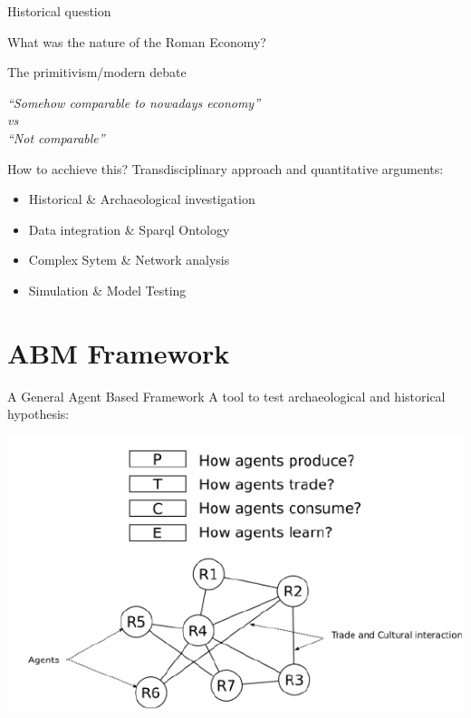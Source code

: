 \documentclass[12pt, handout=show,notes=show]{beamer}
\begin{document}
\begin{frame}{Historical question}
	\begin{center}
		\Huge
		What was the nature of the Roman Economy?\\
	\end{center}
	\vfill
	\begin{block}
		{The primitivism/modern debate}
		\begin{center}
		    \em
		    ``Somehow comparable to nowadays economy'' \\
		    \emph{vs}\\
		    ``Not comparable''
		\end{center}
	\end{block}
\end{frame}

\begin{frame}{How to acchieve this?}
	Transdisciplinary approach and quantitative arguments:
	\begin{itemize}
		\item<1->Historical \& Archaeological investigation
		\item<2-> Data integration \& Sparql Ontology
		\item<3-> Complex Sytem \& Network analysis
		\item<4-> Simulation \& Model Testing
	\end{itemize}
	
\end{frame}
\section{ABM Framework}

\begin{frame}{A General Agent Based Framework }
    A tool to test archaeological and historical hypothesis:
	\begin{center}
	    \includegraphics[width=.6\textwidth]{images/schema_model.png}
	\end{center}
\end{frame}
\end{document}
